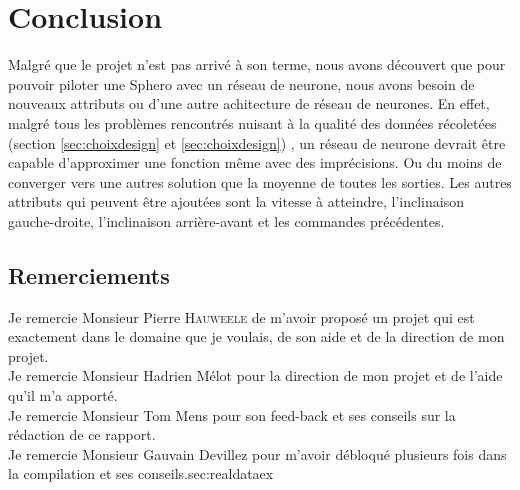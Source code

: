 \documentclass[12pt,a4paper,oneside, titlepage]{article}
\begin{document}




\section{Conclusion}
Malgré que le projet n'est pas arrivé à son terme, nous avons découvert que pour pouvoir piloter une Sphero avec un réseau de neurone, nous avons besoin de nouveaux attributs ou d'une autre achitecture de réseau de neurones.
En effet, malgré tous les problèmes rencontrés nuisant à la qualité des données récoletées (section \ref{sec:choixdesign} et \ref{sec:choixdesign}) ,
un réseau de neurone devrait être capable d'approximer une fonction même avec des imprécisions.
Ou du moins de converger vers une autres solution que la moyenne de toutes les sorties.
Les autres attributs qui peuvent être ajoutées sont la vitesse à atteindre, l'inclinaison gauche-droite, l'inclinaison arrière-avant et les commandes précédentes.

\subsection*{Remerciements}
\noindent Je remercie Monsieur Pierre \textsc{Hauweele} de m'avoir proposé un projet qui est exactement dans le domaine que je voulais, de son aide et de la direction de mon projet.\\

\noindent Je remercie Monsieur Hadrien Mélot pour la direction de mon projet et de l'aide qu'il m'a apporté.\\

\noindent Je remercie Monsieur Tom Mens pour son feed-back et ses conseils sur la rédaction de ce rapport.\\

\noindent Je remercie Monsieur Gauvain Devillez pour m'avoir débloqué plusieurs fois dans la compilation et ses conseils.sec:realdataex


\appendix



\end{document}
